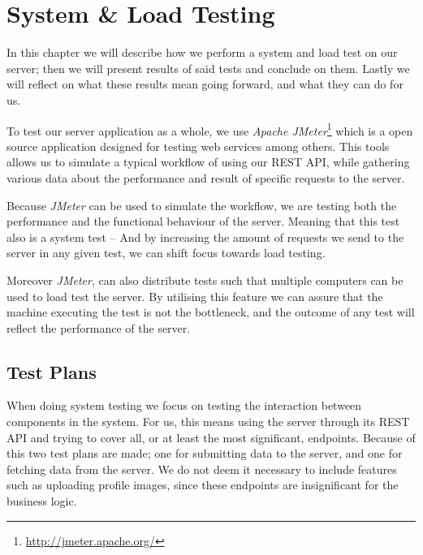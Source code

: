 \chapter{System \& Load Testing}\label{cha:system_and_load_testing}
In this chapter we will describe how we perform a system and load test on our server;
then we will present results of said tests and conclude on them.
Lastly we will reflect on what these results mean going forward, and what they can do for us.

\bigskip
To test our server application as a whole, we use \textit{Apache JMeter}\footnote{\url{http://jmeter.apache.org/}} which is a open source application designed for testing web services among others.
This tools allows us to simulate a typical workflow of using our REST API, while gathering various data about the performance and result of specific requests to the server.

Because \textit{JMeter} can be used to simulate the workflow, we are testing both the performance and the functional behaviour of the server.
Meaning that this test also is a system test -- And by increasing the amount of requests we send to the server in any given test, we can shift focus towards load testing.

Moreover \textit{JMeter}, can also distribute tests such that multiple computers can be used to load test the server.
By utilising this feature we can assure that the machine executing the test is not the bottleneck, and the outcome of any test will reflect the performance of the server.

\section{Test Plans}
When doing system testing we focus on testing the interaction between components in the system.
For us, this means using the server through its REST API and trying to cover all, or at least the most significant, endpoints.
Because of this two test plans are made; one for submitting data to the server, and one for fetching data from the server.
We do not deem it necessary to include features such as uploading profile images, since these endpoints are insignificant for the business logic.

